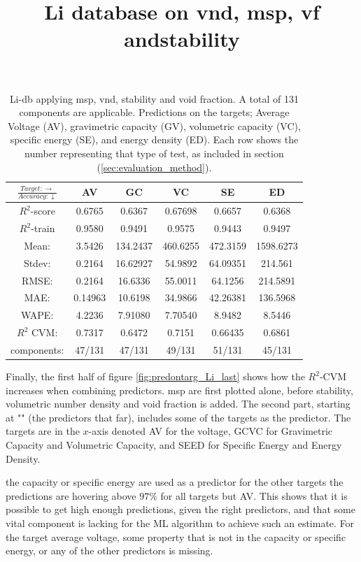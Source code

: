 \begin{table}[h]%
\normalsize
\centering
\caption{Li-db applying msp, vnd, stability and void fraction. A total of 131 components are applicable. Predictions on the targets; Average Voltage (AV), gravimetric capacity (GV), volumetric capacity (VC), specific energy (SE), and energy density (ED). Each row shows the number representing that type of test, as included in section (\ref{sec:evaluation_method}).}
\title{Li database on vnd, msp, vf andstability}
\begin{tabular}{|c|c|c|c|c|c|}
	\hline 
	$\frac{Target: \rightarrow}{Accuracy:\downarrow} $ & AV & GC & VC & SE & ED 
	 \\ 
	\hline
	$R^2$-score 	& 0.6765 & 0.6367 & 0.67698 	& 0.6657 &  0.6368\\ 
	\hline 
	$R^2$-train 	& 0.9580 & 0.9491 & 0.9575 	&  0.9443 &  0.9497 \\ 
	\hline
	Mean: 	 	& 3.5426	&134.2437&460.6255& 472.3159& 1598.6273\\
	\hline 
	Stdev:	 	& 0.2164	&16.62927&54.9892	&64.09351	& 214.561\\
	\hline 
	RMSE: 		&0.2164& 16.6336 &  55.0011 	& 64.1256 &214.5891\\ 
	\hline
	MAE: 		& 0.14963 & 10.6198& 34.9866 & 42.26381 & 136.5968 \\ 
	\hline
	WAPE: 		& 4.2236 & 7.91080 & 7.70540  & 8.9482 & 8.5446 \\
	\hline
	$R^2$ CVM: 	& 0.7317 	& 0.6472 	& 0.7151	 &  0.66435 &0.6861 \\
	\hline
	components: 	& 47/131 	& 47/131 	& 49/131 	 & 51/131 	&45/131 \\
	\hline
\end{tabular}
\label{tab:Li-vnd-msp-vf-stability}
\end{table}

Finally, the first half of figure \ref{fig:predontarg_Li_last} shows how the $R^2$-CVM increases when combining predictors. msp are first plotted alone, before stability, volumetric number density and void fraction is added. The second part, starting at "" (the predictors that far), includes some of the targets as the predictor. The targets are in the $x$-axis denoted AV for the voltage, GCVC for Gravimetric Capacity and Volumetric Capacity, and SEED for Specific Energy and Energy Density. 

the capacity or specific energy are used as a predictor for the other targets the predictions are hovering above $97\%$ for all targets but AV. This shows that it is possible to get high enough predictions, given the right predictors, and that some vital component is lacking for the ML algorithm to achieve such an estimate. For the target average voltage, some property that is not in the capacity or specific energy, or any of the other predictors is missing. 

